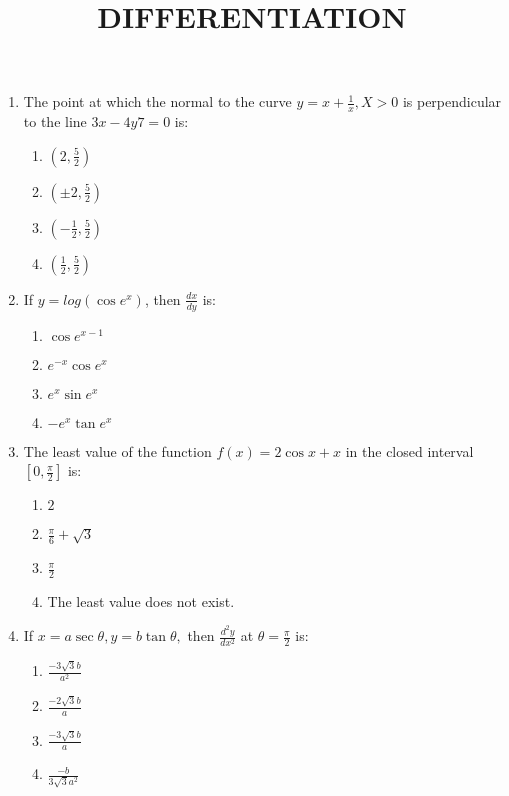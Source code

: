 \documentclass{article}
\begin{document}
\title{\textbf{DIFFERENTIATION}}
\date{}
\maketitle

\begin{enumerate}
\item The point at which the normal to the curve $ y = x + \frac{1}{x}, X > 0$ is perpendicular to the line $3x - 4y 7 = 0$ is:
	\begin{enumerate}
	\item $(2, \frac{5}{2})$
	\item $(\pm2, \frac{5}{2})$
      	\item $(-\frac{1}{2}, \frac{5}{2})$
      	\item $(\frac{1}{2}, \frac{5}{2})$
  	\end{enumerate}

\item If $y = log(\cos e^x)$, then $\frac{dx}{dy}$ is: 
   
	\begin{enumerate}
	\item $ \cos e^{x-1} $
	\item $ e^{-x} \cos e^x $
      	\item $ e^x \sin e^x $
      	\item $ -e^x \tan e^x $
  	\end{enumerate}

\item The least value of the function $ f(x) = 2\cos x + x $ in the closed interval $[0, \frac{\pi}{2}]$ is:

  	\begin{enumerate}
      	\item $ 2 $ 
      	\item $ \frac{\pi}{6} + \sqrt 3$
      	\item $ \frac{\pi}{2} $
	\item  The least value does not exist. 
  	\end{enumerate}

\item If $ x = a\sec \theta, y = b\tan \theta,$ then $ \frac{d^2y}{dx^2} $ at $ \theta = \frac{\pi}{2}$ is:
  
  	\begin{enumerate}
    	\item $ \frac{-3\sqrt 3b}{a^2} $
    	\item $ \frac{-2\sqrt 3b}{a} $
    	\item $ \frac{-3\sqrt 3b}{a} $
    	\item $ \frac{-b}{3 \sqrt 3a^2 }$
  	\end{enumerate}


\end{enumerate}
\end{document}
